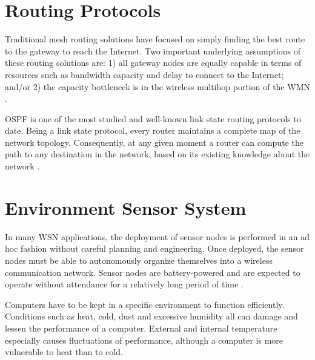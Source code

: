 \section{Routing Protocols}


Traditional mesh routing solutions have focused on simply finding the best route to the gateway to reach the Internet. Two important underlying assumptions of these routing solutions are: 1) all gateway nodes are equally capable in terms of resources such as bandwidth capacity and delay to connect to the Internet; and/or 2) the capacity bottleneck is in the wireless multihop portion of the WMN \cite{Prashanth2015}.


OSPF is one of the most studied and well-known link state routing protocols to date. Being a link state protocol, every router maintains a complete map of the network topology. Consequently, at any given moment a router can compute the path to any destination in the network, based on its existing knowledge about the network \cite{Holter2010}.

\section{Environment Sensor System}
In many WSN applications, the deployment of sensor nodes is performed in an ad hoc fashion without careful planning and engineering. Once deployed, the sensor nodes must be able to autonomously organize themselves into a wireless communication network. Sensor nodes are battery-powered and are expected to operate without attendance for a relatively long period of time \cite{Shio2010}.

Computers have to be kept in a specific environment to function efficiently. Conditions such as heat, cold, dust and excessive humidity all can damage and lessen the performance of a computer. External and internal temperature especially causes fluctuations of performance, although a computer is more vulnerable to heat than to cold.


